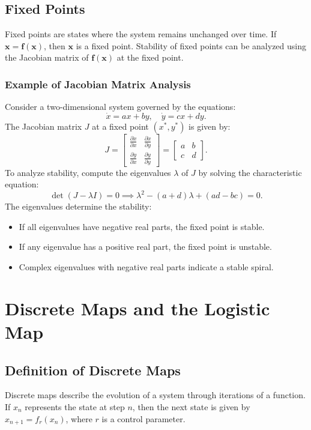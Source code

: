\documentclass{article}
\begin{document}
\subsection{Fixed Points}
Fixed points are states where the system remains unchanged over time. If $\mathbf{x} = \mathbf{f}(\mathbf{x})$, then $\mathbf{x}$ is a fixed point. Stability of fixed points can be analyzed using the Jacobian matrix of $\mathbf{f}(\mathbf{x})$ at the fixed point.

\subsubsection{Example of Jacobian Matrix Analysis}
Consider a two-dimensional system governed by the equations:
\[
\dot{x} = ax + by, \quad \dot{y} = cx + dy.
\]
The Jacobian matrix $J$ at a fixed point $(x^*, y^*)$ is given by:
\[
J = \begin{bmatrix}
\frac{\partial \dot{x}}{\partial x} & \frac{\partial \dot{x}}{\partial y} \\
\frac{\partial \dot{y}}{\partial x} & \frac{\partial \dot{y}}{\partial y}
\end{bmatrix} = \begin{bmatrix}
a & b \\
c & d
\end{bmatrix}.
\]
To analyze stability, compute the eigenvalues $\lambda$ of $J$ by solving the characteristic equation:
\[
\det(J - \lambda I) = 0 \implies \lambda^2 - (a+d)\lambda + (ad - bc) = 0.
\]
The eigenvalues determine the stability:
\begin{itemize}
  \item If all eigenvalues have negative real parts, the fixed point is stable.
  \item If any eigenvalue has a positive real part, the fixed point is unstable.
  \item Complex eigenvalues with negative real parts indicate a stable spiral.
\end{itemize}

\section{Discrete Maps and the Logistic Map}

\subsection{Definition of Discrete Maps}
Discrete maps describe the evolution of a system through iterations of a function. If $x_n$ represents the state at step $n$, then the next state is given by $x_{n+1} = f_r(x_n)$, where $r$ is a control parameter.
\end{document}
